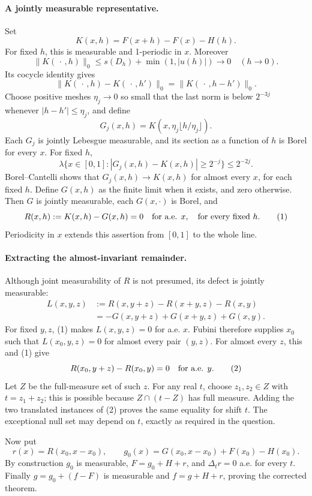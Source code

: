 \paragraph{A jointly measurable representative.}
Set
\[
 K(x,h)=F(x+h)-F(x)-H(h).
\]
For fixed \(h\), this is measurable and 1-periodic in \(x\).
Moreover
\[
 \|K(\,\cdot\,,h)\|_0
 \leq s(D_h)+\min(1,|u(h)|)\longrightarrow0
 \quad(h\to0).
\]
Its cocycle identity gives
\[
 \|K(\,\cdot\,,h)-K(\,\cdot\,,h')\|_0
 =\|K(\,\cdot\,,h-h')\|_0.
\]
Choose positive meshes \(\eta_j\to0\) so small that
the last norm is below \(2^{-3j}\) whenever
\(|h-h'|\leq\eta_j\), and define
\[
 G_j(x,h)=K(x,\eta_j\lfloor h/\eta_j\rfloor).
\]
Each \(G_j\) is jointly Lebesgue measurable, and its
section as a function of \(h\) is Borel for every \(x\).
For fixed \(h\),
\[
 \lambda\{x\in[0,1]:|G_j(x,h)-K(x,h)|\geq2^{-j}\}
 \leq2^{-2j}.
\]
Borel--Cantelli shows that \(G_j(x,h)\to K(x,h)\)
for almost every \(x\), for each fixed \(h\).
Define \(G(x,h)\) as the finite limit when it exists,
and zero otherwise. Then \(G\) is jointly measurable,
each \(G(x,\cdot)\) is Borel, and
\[
 R(x,h):=K(x,h)-G(x,h)=0
 \quad\hbox{for a.e. }x,\quad\hbox{for every fixed }h.
\tag{1}
\]
Periodicity in \(x\) extends this assertion from \([0,1]\)
to the whole line.

\paragraph{Extracting the almost-invariant remainder.}
Although joint measurability of \(R\) is not presumed,
its defect is jointly measurable:
\[
 \begin{split}
 L(x,y,z)
 &:=R(x,y+z)-R(x+y,z)-R(x,y)\\
 &=-G(x,y+z)+G(x+y,z)+G(x,y).
 \end{split}
\]
For fixed \(y,z\), (1) makes \(L(x,y,z)=0\) for a.e. \(x\).
Fubini therefore supplies \(x_0\) such that
\(L(x_0,y,z)=0\) for almost every pair \((y,z)\).
For almost every \(z\), this and (1) give
\[
 R(x_0,y+z)-R(x_0,y)=0\quad\hbox{for a.e. }y.
\tag{2}
\]
Let \(Z\) be the full-measure set of such \(z\).
For any real \(t\), choose \(z_1,z_2\in Z\) with
\(t=z_1+z_2\); this is possible because
\(Z\cap(t-Z)\) has full measure.
Adding the two translated instances of (2) proves
the same equality for shift \(t\).
The exceptional null set may depend on \(t\), exactly
as required in the question.

Now put
\[
 r(x)=R(x_0,x-x_0),\qquad
 g_0(x)=G(x_0,x-x_0)+F(x_0)-H(x_0).
\]
By construction \(g_0\) is measurable,
\(F=g_0+H+r\), and \(\Delta_t r=0\) a.e. for every \(t\).
Finally \(g=g_0+(f-F)\) is measurable and
\(f=g+H+r\), proving the corrected theorem.

